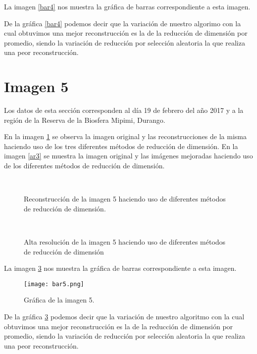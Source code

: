 La imagen \ref{bar4} nos muestra la gráfica de barras correspondiente a esta imagen.



De la gráfica \ref{bar4} podemos decir que la variación de nuestro algorimo con la cual obtuvimos una mejor reconstrucción es la de la reducción de dimensión por promedio, siendo la variación de reducción por selección aleatoria la que realiza una peor reconstrucción.


\section{Imagen 5}

Los datos de esta sección corresponden al día 19 de febrero del año 2017 y a la región de la Reserva de la Biosfera Mipimi, Durango. 

En la imagen \ref{rec5} se observa la imagen original y las reconstrucciones de la misma haciendo uso de los tres diferentes métodos de reducción de dimensión. En la imagen \ref{ar3} se muestra la imagen original y las imágenes mejoradas haciendo uso de los diferentes métodos de reducción de dimensión. 

\begin{figure}[!htbp]
  \centering
  \qquad
  \qquad
  \\
  \caption{Reconstrucción de la imagen 5 haciendo uso de diferentes métodos de reducción de dimensión.}
  \label{rec5}
\end{figure}


\begin{figure}[!tbp]
  \centering
  \qquad
  \qquad
  \\
  \caption{Alta resolución de la imagen 5 haciendo uso de diferentes métodos de reducción de dimensión}
  \label{ar5}
\end{figure}

La imagen \ref{bar5} nos muestra la gráfica de barras correspondiente a esta imagen.

\begin{figure}
\centering
\texttt{[image: bar5.png]}
\caption{Gráfica de la imagen 5.}
\label{bar5}
\end{figure}

De la gráfica \ref{bar5} podemos decir que la variación de nuestro algoritmo con la cual obtuvimos una mejor reconstrucción es la de la reducción de dimensión por promedio, siendo la variación de reducción por selección aleatoria la que realiza una peor reconstrucción.
